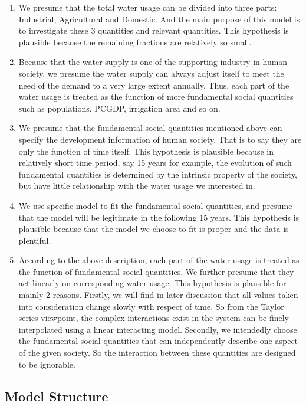     \begin{enumerate}
      \item We presume that the total water usage can be divided into three parts: Industrial, Agricultural and Domestic. And the main purpose of this model is to investigate these 3 quantities and relevant quantities. This hypothesis is plausible because the remaining fractions are relatively so small.
      \item Because that the water supply is one of the supporting industry in human society, we presume the water supply can always adjust itself to meet the need of the demand to a very large extent annually. Thus, each part of the water usage is treated as the function of more fundamental social quantities such as populations, PCGDP, irrigation area and so on.
      \item We presume that the fundamental social quantities mentioned above can specify the development information of human society. That is to say they are only the function of time itself. This hypothesis is plausible because in relatively short time period, say 15 years for example, the evolution of such fundamental quantities is determined by the intrinsic property of the society, but have little relationship with the water usage we interested in.
      \item We use specific model to fit the fundamental social quantities, and presume that the model will be legitimate in the following 15 years. This hypothesis is plausible because that the model we choose to fit is proper and the data is plentiful.
      \item According to the above description, each part of the water usage is treated as the function of fundamental social quantities. We further presume that they act linearly on corresponding water usage. This hypothesis is plausible for mainly 2 reasons. Firstly, we will find in later discussion that all values taken into consideration change slowly with respect of time. So from the Taylor series viewpoint, the complex interactions exist in the system can be finely interpolated using a linear interacting model.  Secondly, we intendedly choose the fundamental social quantities that can independently describe one aspect of the given society. So the interaction between these quantities are designed to be ignorable.
    \end{enumerate}

  \subsection{Model Structure}

